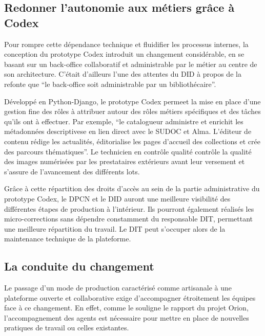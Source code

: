 \subsection{Redonner l'autonomie aux métiers grâce à Codex}
Pour rompre cette dépendance technique et fluidifier les processus internes, la conception du prototype Codex introduit un changement considérable, en se basant sur un back-office collaboratif et administrable par le métier au centre de son architecture. C'était d'ailleurs l'une des attentes du DID à propos de la refonte que \enquote{le back-office soit administrable par un bibliothécaire}.

Développé en Python-Django, le prototype Codex permeet la mise en place d'une gestion fine des rôles à attribuer autour des rôles métiers spécifiques et des tâches qu'ils ont à effectuer. Par exemple, \enquote{le catalogueur administre et enrichit les métadonnées descriptivese en lien direct avec le SUDOC et Alma. L'éditeur de contenu rédige les actualités, éditorialise les pages d'accueil des collections et crée des parcours thématiques}. Le technicien en contrôle qualité contrôle la qualité des images numérisées par les prestataires extérieurs avant leur versement et s'assure de l'avancement des différents lots.

Grâce à cette répartition des droits d'accès au sein de la partie administrative du prototype Codex, le DPCN et le DID auront une meilleure visibilité des différentes étapes de production à l'intérieur. Ils pourront également réalisés les micro-corrections sans dépendre constamment du responsable DIT, permettant une meilleure répartition du travail. Le DIT peut s'occuper alors de la maintenance technique de la plateforme.

\subsection{La conduite du changement}
Le passage d'un mode de production caractérisé comme artisanale à une plateforme ouverte et collaborative exige d'accompagner étroitement les équipes face à ce changement. En effet, comme le souligne le rapport du projet Orion, l'accompagnement des agents est nécessaire pour mettre en place de nouvelles pratiques de travail ou celles existantes.


